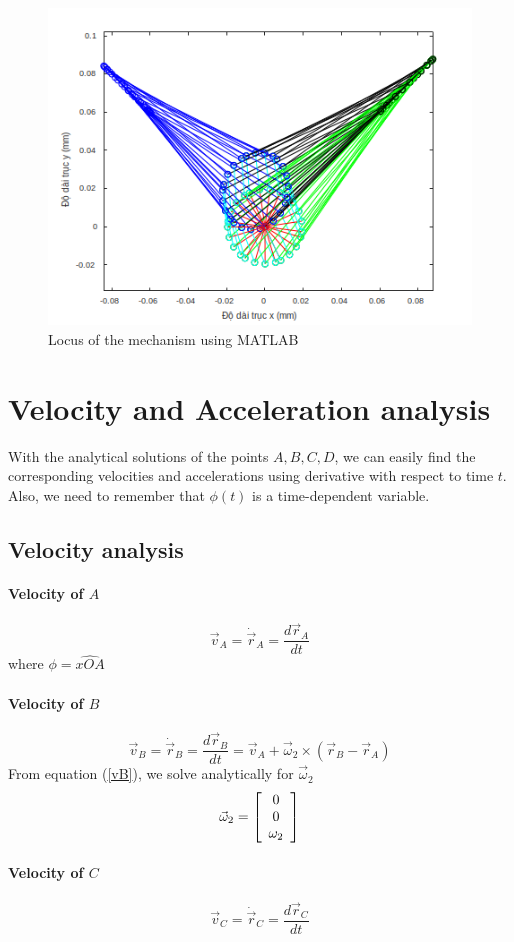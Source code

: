 \begin{figure}
	\centering
	\includegraphics[width=0.7\linewidth]{05}
	\caption{Locus of the mechanism using MATLAB\textup{\textregistered}}
	\label{fig:05}
\end{figure}
\section{Velocity and Acceleration analysis}
With the analytical solutions of the points $ A,B,C,D $, we can easily find the corresponding velocities and accelerations using derivative with respect to time $ t $. Also, we need to remember that $ \phi(t) $ is a time-dependent variable.
\subsection{Velocity analysis}
\paragraph{Velocity of $ A $}
\begin{equation}\label{vA}
\vec{v}_A=\dot{\vec{r}}_A=\dfrac{d\vec{r}_A}{dt}
\end{equation}
where $ \phi=\widehat{xOA} $
\paragraph{Velocity of $ B $}
\begin{equation}\label{vB}
\vec{v}_B=\dot{\vec{r}}_B=\dfrac{d\vec{r}_B}{dt}=\vec{v}_A+\vec{\omega}_2\times(\vec{r}_B-\vec{r}_A)
\end{equation}
From equation (\ref{vB}), we solve analytically for $ \vec{\omega}_2 $
\[\vec{\omega}_2=\left[ \begin{array}{c} 0\\ 0\\ \omega_2 \end{array}\right]\]
\paragraph{Velocity of $ C $}
\begin{equation}\label{vC}
\vec{v}_C=\dot{\vec{r}}_C=\dfrac{d\vec{r}_C}{dt}
\end{equation}
